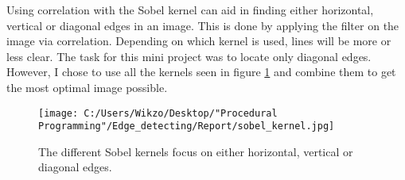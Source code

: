 Using correlation with the Sobel kernel can aid in finding either horizontal, vertical or diagonal edges in an image. This is done by applying the filter on the image via correlation. Depending on which kernel is used, lines will be more or less clear. The task for this mini project was to locate only diagonal edges. However, I chose to use all the kernels seen in figure \ref{sobel_kernel} and combine them to get the most optimal image possible.

\begin{figure} [htbp]
\texttt{[image: C:/Users/Wikzo/Desktop/"Procedural Programming"/Edge\_detecting/Report/sobel\_kernel.jpg]}
\centering
\label{sobel_kernel}
\caption{The different Sobel kernels focus on either horizontal, vertical or diagonal edges.}
\end{figure}

